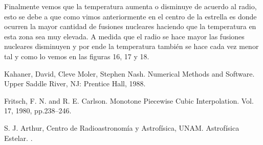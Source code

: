 \documentclass[12pt]{article}
\begin{document}
Finalmente vemos que la temperatura aumenta o disminuye de acuerdo al radio, esto se debe a que como vimos anteriormente en el centro de la estrella es donde ocurren la mayor cantidad de fusiones nucleares haciendo que la temperatura en esta zona sea muy elevada. A medida que el radio se hace mayor las fusiones nucleares disminuyen y por ende la temperatura también se hace cada vez menor tal y como lo vemos en las figuras 16, 17 y 18.



\begin{thebibliography}{10}

 Kahaner, David, Cleve Moler, Stephen Nash. 
\newblock Numerical Methods and Software.
\newblock Upper Saddle River, NJ: Prentice Hall, 1988.

 Fritsch, F. N. and R. E. Carlson.
\newblock Monotone Piecewise Cubic Interpolation.
 Vol. 17, 1980, pp.238–246.

S. J. Arthur,  Centro de Radioastronomía y Astrofísica, UNAM. 
\newblock Astrofísica Estelar.
.






\end{thebibliography}
\end{document}
